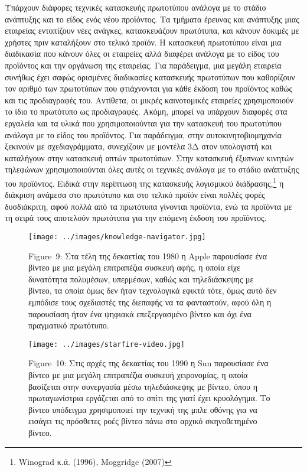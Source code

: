 \documentclass[
]{article}
\begin{document}
Υπάρχουν διάφορες τεχνικές κατασκευής πρωτοτύπου ανάλογα με το στάδιο
ανάπτυξης και το είδος ενός νέου προϊόντος. Τα τμήματα έρευνας και
ανάπτυξης μιας εταιρείας εντοπίζουν νέες ανάγκες, κατασκευάζουν
πρωτότυπα, και κάνουν δοκιμές με χρήστες πριν καταλήξουν στο τελικό
προϊόν. Η κατασκευή πρωτοτύπου είναι μια διαδικασία που κάνουν όλες οι
εταιρείες αλλά διαφέρει ανάλογα με το είδος του προϊόντος και την
οργάνωση της εταιρείας. Για παράδειγμα, μια μεγάλη εταιρεία συνήθως έχει
σαφώς ορισμένες διαδικασίες κατασκευής πρωτοτύπων που καθορίζουν τον
αριθμό των πρωτοτύπων που φτιάχνονται για κάθε έκδοση του προϊόντος
καθώς και τις προδιαγραφές του. Αντίθετα, οι μικρές καινοτομικές
εταιρείες χρησιμοποιούν το ίδιο το πρωτότυπο ως προδιαγραφές. Ακόμη,
μπορεί να υπάρχουν διαφορές στα εργαλεία και τα υλικά που
χρησιμοποιούνται για την κατασκευή του πρωτοτύπου ανάλογα με το είδος
του προϊόντος. Για παράδειγμα, στην αυτοκινητοβιομηχανία ξεκινούν με
σχεδιαγράμματα, συνεχίζουν με μοντέλα 3Δ στον υπολογιστή και καταλήγουν
στην κατασκευή απτών πρωτοτύπων. Στην κατασκευή έξυπνων κινητών
τηλεφώνων χρησιμοποιούνται όλες αυτές οι τεχνικές ανάλογα με το στάδιο
ανάπτυξης του προϊόντος. Ειδικά στην περίπτωση της κατασκευής λογισμικού
διάδρασης,\footnote{Winograd κ.ά. (1996), Moggridge (2007)} η διάκριση
ανάμεσα στο πρωτότυπο και στο τελικό προϊόν είναι πολλές φορές
δυσδιάκριτη, αφού πολλά από τα πρωτότυπα γίνονται προϊόντα, ενώ τα
προϊόντα με τη σειρά τους αποτελούν πρωτότυπα για την επόμενη έκδοση του
προϊόντος.

\leavevmode{}%
\begin{figure}
\hypertarget{fig:knowledge-navigator}{%
\centering
\texttt{[image: ../images/knowledge-navigator.jpg]}
\caption{Figure~9: Στα τέλη της δεκαετίας του 1980 η Apple παρουσίασε
ένα βίντεο με μια μεγάλη επιτραπέζια συσκευή αφής, η οποία είχε
δυνατότητα πολυμέσων, υπερμέσων, καθώς και τηλεδιάσκεψης με βίντεο, τα
οποία όμως δεν ήταν τεχνολογικά εφικτά τότε, όμως αυτό δεν εμπόδισε τους
σχεδιαστές της διεπαφής να τα φανταστούν, αφού όλη η παρουσίαση ήταν ένα
ψηφιακά επεξεργασμένο βίντεο και όχι ένα πραγματικό
πρωτότυπο.}\label{fig:knowledge-navigator}
}
\end{figure}

\leavevmode{}%
\begin{figure}
\hypertarget{fig:starfire-video}{%
\centering
\texttt{[image: ../images/starfire-video.jpg]}
\caption{Figure~10: Στις αρχές της δεκαετίας του 1990 η Sun παρουσίασε
ένα βίντεο με μια μεγάλη επιτραπέζια συσκευή χειρονομίας, η οποία
βασίζεται στην συνεργασία μέσω τηλεδιάσκεψης με βίντεο, όπου η
πρωταγωνίστρια εργάζεται από το σπίτι της γιατί έχει κρυολόγημα. Το
βίντεο υπόδειγμα χρησιμοποιεί την τεχνική της μπλε οθόνης για να εισάγει
τις πρόσθετες ροές βίντεο πάνω στο αρχικό σκηνοθετημένο
βίντεο.}\label{fig:starfire-video}
}
\end{figure}
\end{document}
